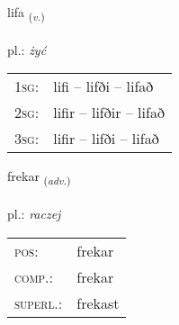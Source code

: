 \documentclass[frontgrid, backgrid]{flacards}\usepackage[]{graphicx}\usepackage[]{xcolor}
\begin{document}
{lifa \small{\textsubscript{(\textit{v.})}} \\[1ex] %
\textphonetic{[lɪːva]} \\
pl.: \emph{żyć} \\  [2ex]
\renewcommand*{\arraystretch}{0.8}
\begin{tabular}{p{1cm}l}
\textsc{1sg}: & lifi -- lifði -- lifað \\ 
\textsc{2sg}: & lifir -- lifðir -- lifað \\ 
\textsc{3sg}: & lifir -- lifði -- lifað \\ 
\end{tabular}
}

\renewcommand{\flhead}{\vskip5pt \fboxsep=0pt {\small\bfseries\footnotesize Atviksorð | przysłówek}}
\renewcommand{\fcfoot}{\vskip5pt \fboxsep=0pt \hspace{2pt}{\small\bfseries\footnotesize 1K}}

\renewcommand{\blhead}{\vskip5pt {\small\bfseries\footnotesize Atviksorð | przysłówek }}
\renewcommand{\bcfoot}{\vskip5pt \hspace{2pt}{\small\bfseries\footnotesize 1K}}


{frekar \small{\textsubscript{(\textit{adv.})}} \\[1ex] %
\textphonetic{[frɛːkar]} \\
pl.: \emph{raczej} \\  [2ex]
\renewcommand*{\arraystretch}{0.8}
\begin{tabular}{ll}
\textsc{pos}: & frekar \\ 
\textsc{comp.}: & frekar \\ 
\textsc{superl.}: & frekast \\
\end{tabular}
}

\renewcommand{\flhead}{\vskip5pt \fboxsep=0pt {\small\bfseries\footnotesize Nafnorð | rzeczownik}}
\renewcommand{\fcfoot}{\vskip5pt \fboxsep=0pt \hspace{2pt}{\small\bfseries\footnotesize 1K}}
\end{document}
